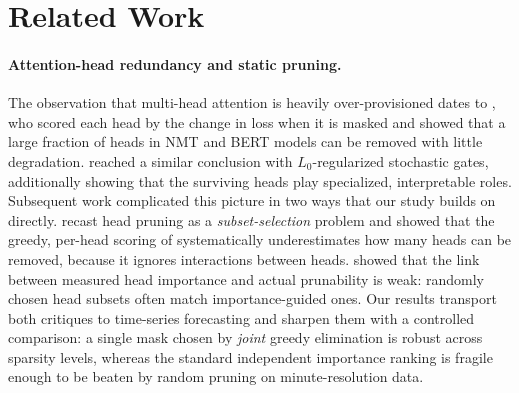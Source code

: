 
\section{Related Work}
\label{sec:related}

\paragraph{Attention-head redundancy and static pruning.}
The observation that multi-head attention is heavily over-provisioned dates
to \citet{michel2019sixteen}, who scored each head by the change in loss
when it is masked and showed that a large fraction of heads in NMT and BERT
models can be removed with little degradation. \citet{voita2019analyzing}
reached a similar conclusion with $L_0$-regularized stochastic gates,
additionally showing that the surviving heads play specialized, interpretable
roles. Subsequent work complicated this picture in two ways that our study
builds on directly. \citet{li2021differentiable} recast head pruning as a
\emph{subset-selection} problem and showed that the greedy, per-head scoring
of \citet{michel2019sixteen} systematically underestimates how many heads can
be removed, because it ignores interactions between heads.
\citet{budhraja2020weak} showed that the link between measured head
importance and actual prunability is weak: randomly chosen head subsets often
match importance-guided ones. Our results transport both critiques to
time-series forecasting and sharpen them with a controlled comparison: a
single mask chosen by \emph{joint} greedy elimination is robust across
sparsity levels, whereas the standard independent importance ranking is
fragile enough to be beaten by random pruning on minute-resolution data.

